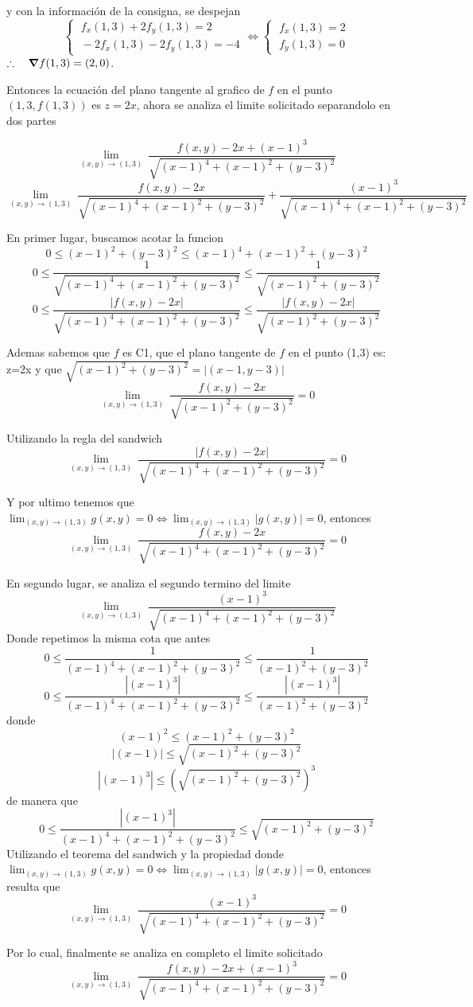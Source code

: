 \begin{solution}
    y con la información de la consigna, se despejan
    \[\begin{cases}
            \;f_x(1,3) + 2f_y(1,3)=2 \\[5pt]
            \;-2f_x(1,3)- 2f_y(1,3)=-4
        \end{cases}
        \iff
        \begin{cases}
            \;f_x(1,3)=2 \\[5pt]
            \;f_y(1,3)=0
        \end{cases}
    \]
    $\therefore\quad\grad f(1,3)=(2,0)$.

   Entonces la ecuación del plano tangente al grafico de $f$ en el punto $(1,3,f(1,3))$ es $z  = 2x$, ahora se analiza el limite solicitado separandolo en dos partes

    \[
        \lim_{(x,y)\to (1,3)} \ 
        \frac{f(x,y)-2x+(x-1)^3}{\sqrt{(x-1)^4+(x-1)^2+(y-3)^2}}
 \]
        \[
        \lim_{(x,y)\to (1,3)} \ 
        \frac{f(x,y)-2x}{\sqrt{(x-1)^4+(x-1)^2+(y-3)^2}}+ \frac{(x-1)^3}{\sqrt{(x-1)^4+(x-1)^2+(y-3)^2}} 
    \]

En primer lugar, buscamos acotar la funcion
\[
0\le (x-1)^2+(y-3)^2\le (x-1)^4+(x-1)^2+(y-3)^2
\]\[
0\le \frac{1}{\sqrt{(x-1)^4+(x-1)^2+(y-3)^2}} \le \frac{1}{\sqrt{(x-1)^2+(y-3)^2}}
\]
\[
0\le \frac{|f(x,y)-2x|}{\sqrt{(x-1)^4+(x-1)^2+(y-3)^2}} \le \frac{|f(x,y)-2x|}{\sqrt{(x-1)^2+(y-3)^2}}
\]

Ademas sabemos que $f$ es C1, que el plano tangente de $f$ en el punto (1,3) es: z=2x y que $\sqrt{(x-1)^2+(y-3)^2}=|(x-1,y-3)|$
\[
        \lim_{(x,y)\to (1,3)} \ 
        \frac{f(x,y)-2x}{\sqrt{(x-1)^2+(y-3)^2}}=0
 \]

Utilizando la regla del sandwich
\[
        \lim_{(x,y)\to (1,3)} \ 
        \frac{|f(x,y)-2x|}{\sqrt{(x-1)^4+(x-1)^2+(y-3)^2}}=0
 \]

 Y por ultimo tenemos que $  \lim_{(x,y)\to(1,3)} g(x,y)=0 \iff \lim_{(x,y)\to(1,3)} |g(x,y)|=0$, entonces
 \[
        \lim_{(x,y)\to (1,3)} \ 
        \frac{f(x,y)-2x}{\sqrt{(x-1)^4+(x-1)^2+(y-3)^2}}=0
 \]

 En segundo lugar, se analiza el segundo termino del limite
  \[
        \lim_{(x,y)\to (1,3)} \ 
       \frac{(x-1)^3}{\sqrt{(x-1)^4+(x-1)^2+(y-3)^2}} 
    \]
    Donde repetimos la misma cota que antes
    \[
0\le \frac{1}{(x-1)^4+(x-1)^2+(y-3)^2} \le \frac{1}{(x-1)^2+(y-3)^2}
\]
\[
0\le \frac{|(x-1)^3|}{(x-1)^4+(x-1)^2+(y-3)^2} \le \frac{|(x-1)^3|}{(x-1)^2+(y-3)^2}
\]
donde
\[
(x-1)^2\le(x-1)^2+(y-3)^2
\]
\[
|(x-1)|\le \sqrt{(x-1)^2+(y-3)^2}
\]
\[
|(x-1)^3|\le (\sqrt{(x-1)^2+(y-3)^2})^3
\]
de manera que
\[
0\le \frac{|(x-1)^3|}{(x-1)^4+(x-1)^2+(y-3)^2} \le \sqrt{(x-1)^2+(y-3)^2}
\]
 Utilizando el teorema del sandwich y la propiedad donde $  \lim_{(x,y)\to(1,3)} g(x,y)=0 \iff \lim_{(x,y)\to(1,3)} |g(x,y)|=0$, entonces resulta que
 \[
        \lim_{(x,y)\to (1,3)} \ 
       \frac{(x-1)^3}{\sqrt{(x-1)^4+(x-1)^2+(y-3)^2}} =0
    \]

Por lo cual, finalmente se analiza en completo el limite solicitado
 \[
        \lim_{(x,y)\to (1,3)} \ 
        \frac{f(x,y)-2x+(x-1)^3}{\sqrt{(x-1)^4+(x-1)^2+(y-3)^2}} =0      
    \]
\end{solution}
